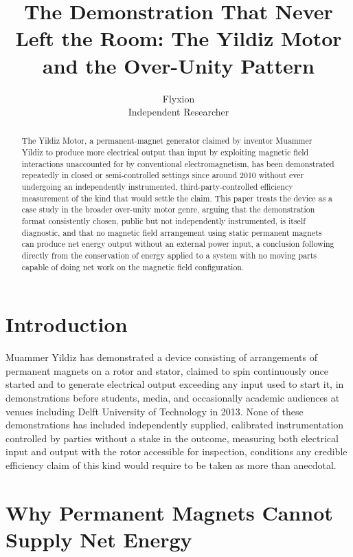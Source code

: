 \documentclass[11pt]{article}
\title{The Demonstration That Never Left the Room: The Yildiz Motor and the Over-Unity Pattern}
\author{Flyxion \\ \small Independent Researcher}
\date{}
\begin{document}
\maketitle

\begin{abstract}
The Yildiz Motor, a permanent-magnet generator claimed by inventor Muammer Yildiz to produce more electrical output than input by exploiting magnetic field interactions unaccounted for by conventional electromagnetism, has been demonstrated repeatedly in closed or semi-controlled settings since around 2010 without ever undergoing an independently instrumented, third-party-controlled efficiency measurement of the kind that would settle the claim. This paper treats the device as a case study in the broader over-unity motor genre, arguing that the demonstration format consistently chosen, public but not independently instrumented, is itself diagnostic, and that no magnetic field arrangement using static permanent magnets can produce net energy output without an external power input, a conclusion following directly from the conservation of energy applied to a system with no moving parts capable of doing net work on the magnetic field configuration.
\end{abstract}

\section{Introduction}

Muammer Yildiz has demonstrated a device consisting of arrangements of permanent magnets on a rotor and stator, claimed to spin continuously once started and to generate electrical output exceeding any input used to start it, in demonstrations before students, media, and occasionally academic audiences at venues including Delft University of Technology in 2013. None of these demonstrations has included independently supplied, calibrated instrumentation controlled by parties without a stake in the outcome, measuring both electrical input and output with the rotor accessible for inspection, conditions any credible efficiency claim of this kind would require to be taken as more than anecdotal.

\section{Why Permanent Magnets Cannot Supply Net Energy}
\end{document}

